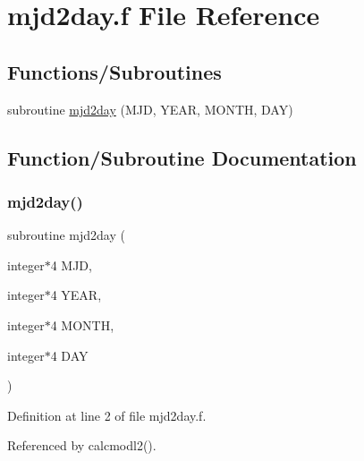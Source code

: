 \hypertarget{mjd2day_8f}{}\section{mjd2day.\+f File Reference}
\label{mjd2day_8f}
\subsection*{Functions/\+Subroutines}
\begin{DoxyCompactItemize}
\item 
subroutine \hyperlink{mjd2day_8f_a37f8fec791fed911d7ada6b723e0c923}{mjd2day} (M\+JD, Y\+E\+AR, M\+O\+N\+TH, D\+AY)
\end{DoxyCompactItemize}


\subsection{Function/\+Subroutine Documentation}
\mbox{\label{mjd2day_8f_a37f8fec791fed911d7ada6b723e0c923}} 
\subsubsection{\texorpdfstring{mjd2day()}{mjd2day()}}
{\footnotesize\ttfamily subroutine mjd2day (\begin{DoxyParamCaption}\item[{integer$\ast$4}]{M\+JD,  }\item[{integer$\ast$4}]{Y\+E\+AR,  }\item[{integer$\ast$4}]{M\+O\+N\+TH,  }\item[{integer$\ast$4}]{D\+AY }\end{DoxyParamCaption})}



Definition at line 2 of file mjd2day.\+f.



Referenced by calcmodl2().

